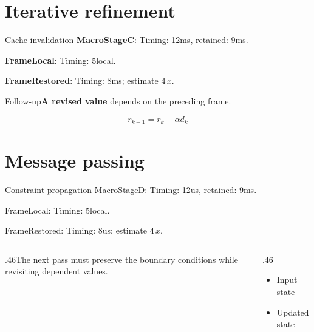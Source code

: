 \documentclass[10pt,aspectratio=43]{beamer}
\newcommand{\fuzzlayerA}[1]{\textbf{#1}}
\newcommand{\fuzzterm}[1]{\fuzzlayerA{#1}}
\newcommand{\fuzzpair}[2]{\fuzzterm{#1}: #2}
\newcommand{\fuzzunit}{ms}
\let\fuzzoriginalunit\fuzzunit
\newcommand{\fuzzcoefficient}{4}
\newcommand{\fuzzscale}[2][\fuzzcoefficient]{#1\,#2}
\begin{document}
\section{Iterative refinement}
\begin{frame}[t]{Cache invalidation}
\fuzzpair{MacroStageC}{Timing: 12\fuzzunit, retained: 9\fuzzoriginalunit.}\par
{\renewcommand{\fuzzunit}{local}\fuzzpair{FrameLocal}{Timing: 5\fuzzunit.}\par}
\fuzzpair{FrameRestored}{Timing: 8\fuzzunit; estimate $\fuzzscale{x}$.}\par
\begin{block}{Follow-up}\fuzzterm{A revised value} depends on the preceding frame.\end{block}
\[r_{k+1}=r_k-\alpha d_k\]
\end{frame}
\renewcommand{\fuzzunit}{us}
\renewcommand{\fuzzcoefficient}{4}
\renewcommand{\fuzzterm}[1]{{\textrm{#1}}}
\section{Message passing}
\begin{frame}[t]{Constraint propagation}
\fuzzpair{MacroStageD}{Timing: 12\fuzzunit, retained: 9\fuzzoriginalunit.}\par
{\renewcommand{\fuzzunit}{local}\fuzzpair{FrameLocal}{Timing: 5\fuzzunit.}\par}
\fuzzpair{FrameRestored}{Timing: 8\fuzzunit; estimate $\fuzzscale{x}$.}\par
\begin{columns}[T]\begin{column}{.46\textwidth}The next pass must preserve the boundary conditions while revisiting dependent values.\end{column}\begin{column}{.46\textwidth}\begin{itemize}\item Input state\item Updated state\end{itemize}\end{column}\end{columns}
\end{frame}
\end{document}
